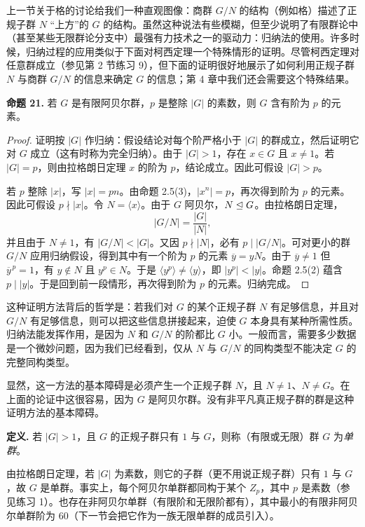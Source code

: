 上一节关于格的讨论给我们一种直观图像：商群 $G/N$ 的结构（例如格）描述了正规子群 $N$ “上方”的 $G$ 的结构。虽然这种说法有些模糊，但至少说明了有限群论中（甚至某些无限群论分支中）最强有力技术之一的驱动力：归纳法的使用。许多时候，归纳过程的应用类似于下面对柯西定理一个特殊情形的证明。尽管柯西定理对任意群成立（参见第 2 节练习 9），但下面的证明很好地展示了如何利用正规子群 $N$ 与商群 $G/N$ 的信息来确定 $G$ 的信息；第 4 章中我们还会需要这个特殊结果。

\medskip
\noindent\textbf{命题 21.} 若 $G$ 是有限阿贝尔群，$p$ 是整除 $|G|$ 的素数，则 $G$ 含有阶为 $p$ 的元素。

\begin{proof}
证明按 $|G|$ 作归纳：假设结论对每个阶严格小于 $|G|$ 的群成立，然后证明它对 $G$ 成立（这有时称为完全归纳）。由于 $|G|>1$，存在 $x\in G$ 且 $x\neq1$。若 $|G|=p$，则由拉格朗日定理 $x$ 的阶为 $p$，结论成立。因此可假设 $|G|>p$。

若 $p$ 整除 $|x|$，写 $|x|=pn$。由命题 2.5(3)，$|x^n|=p$，再次得到阶为 $p$ 的元素。因此可假设 $p\nmid |x|$。令 $N=\langle x\rangle$。由于 $G$ 阿贝尔，$N\trianglelefteq G$。由拉格朗日定理，
\[
  |G/N|=\frac{|G|}{|N|},
\]
并且由于 $N\neq1$，有 $|G/N|<|G|$。又因 $p\nmid |N|$，必有 $p\mid |G/N|$。可对更小的群 $G/N$ 应用归纳假设，得到其中有一个阶为 $p$ 的元素 $\overline y=yN$。由于 $\overline y\neq1$ 但 $\overline y^{\,p}=1$，有 $y\notin N$ 且 $y^p\in N$。于是 $\langle y^p\rangle\neq\langle y\rangle$，即 $|y^p|<|y|$。命题 2.5(2) 蕴含 $p\mid |y|$。于是回到前一段情形，再次得到阶为 $p$ 的元素。归纳完成。
\end{proof}

这种证明方法背后的哲学是：若我们对 $G$ 的某个正规子群 $N$ 有足够信息，并且对 $G/N$ 有足够信息，则可以把这些信息拼接起来，迫使 $G$ 本身具有某种所需性质。归纳法能发挥作用，是因为 $N$ 和 $G/N$ 的阶都比 $G$ 小。一般而言，需要多少数据是一个微妙问题，因为我们已经看到，仅从 $N$ 与 $G/N$ 的同构类型不能决定 $G$ 的完整同构类型。

显然，这一方法的基本障碍是必须产生一个正规子群 $N$，且 $N\neq1$、$N\neq G$。在上面的论证中这很容易，因为 $G$ 是阿贝尔群。没有非平凡真正规子群的群是这种证明方法的基本障碍。

\noindent\textbf{定义.} 若 $|G|>1$，且 $G$ 的正规子群只有 $1$ 与 $G$，则称（有限或无限）群 $G$ 为\emph{单群}。

由拉格朗日定理，若 $|G|$ 为素数，则它的子群（更不用说正规子群）只有 $1$ 与 $G$，故 $G$ 是单群。事实上，每个阿贝尔单群都同构于某个 $Z_p$，其中 $p$ 是素数（参见练习 1）。也存在非阿贝尔单群（有限阶和无限阶都有），其中最小的有限非阿贝尔单群阶为 $60$（下一节会把它作为一族无限单群的成员引入）。

